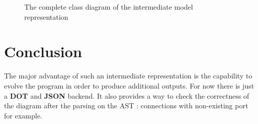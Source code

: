 \begin{figure}[H]
  \centering
  \caption[Class diagram of the intermediate model]{The complete class diagram of the intermediate model representation}
  \label{fig:model-class-diagram}
\end{figure}

\section{Conclusion}

The major advantage of such an intermediate representation is the capability to
evolve the program in order to produce additional outputs. For now there is just
a \textbf{DOT} and \textbf{JSON} backend. It also provides a way to check the
correctness of the diagram after the parsing on the AST : connections with
non-existing port for example.

